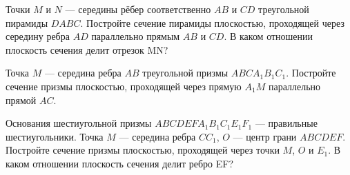 \begin{class}[number=3]
	\begin{listofex}
		\item Точки \( M \) и \( N \) --- середины рёбер соответственно \( AB \) и \( CD \) треугольной пирамиды \( DABC \).
		Постройте сечение пирамиды плоскостью, проходящей через середину ребра \( AD \) параллельно прямым \( AB \) и \( CD \).
		В каком отношении плоскость сечения делит отрезок MN?
		\item Точка \( M \) --- середина ребра \( AB \) треугольной призмы \( ABCA_1B_1C_1 \).
		Постройте сечение призмы плоскостью,
		проходящей через прямую \( A_1M \) параллельно прямой \( AC \).
		\item Основания шестиугольной призмы \( ABCDEFA_1B_1C_1E_1F_1 \) --- правильные шестиугольники.
		Точка \( M \) --- середина ребра \( CC_1 \),
		\( O \) --- центр грани \( ABCDEF \).
		Постройте сечение призмы плоскостью, проходящей через
		точки \( M \), \( O \) и \( E_1 \).
		В каком отношении плоскость сечения делит ребро EF?
	\end{listofex}
\end{class}

